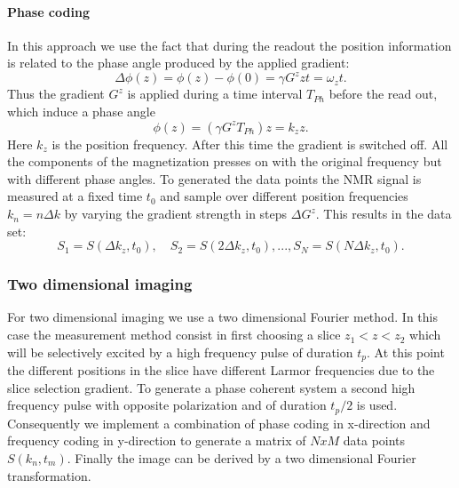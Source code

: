 \paragraph{Phase coding}
In this approach we use the fact that during the readout the position information is related to the phase angle produced by the applied gradient:
\begin{equation}
\Delta \phi(z)= \phi(z)-\phi(0) = \gamma G^z z t= \omega_z t.
\end{equation}
Thus the gradient  $G^z$ is applied during a time interval $T_{Ph}$ before the read out, which induce a phase angle \begin{equation}
\phi(z) = (\gamma G^z T_{Ph})z = k_z z.
\end{equation}
Here $k_z$ is the position frequency. After this time the gradient is switched off. All the components of the magnetization presses on with the original frequency but with different phase angles.  
To generated the data points the NMR signal is measured at a fixed time $t_0$ and sample over different position frequencies $k_n = n\Delta k$ by varying the gradient strength in steps $\Delta G^z$.  This results in the data set: 
$$S_1 = S(\Delta k_z,t_0), \quad S_2 = S(2\Delta k_z, t_0), ..., S_N = S(N\Delta k_z, t_0).$$

\subsubsection{Two dimensional imaging}
For two dimensional imaging we use a two dimensional Fourier method. In this case the measurement method consist in first choosing a slice $z_1 < z < z_2$ which will be selectively excited by a high frequency pulse of duration $t_p$. At this point the different positions in the slice have different Larmor frequencies due to the slice selection gradient. To generate a phase coherent system a second high frequency pulse with opposite polarization and of duration $t_p/2$ is used. Consequently we implement a combination of phase coding in x-direction and frequency coding in y-direction to generate a matrix of $NxM$ data points $S(k_n, t_m)$. Finally the image can be derived by a two dimensional Fourier transformation. 














